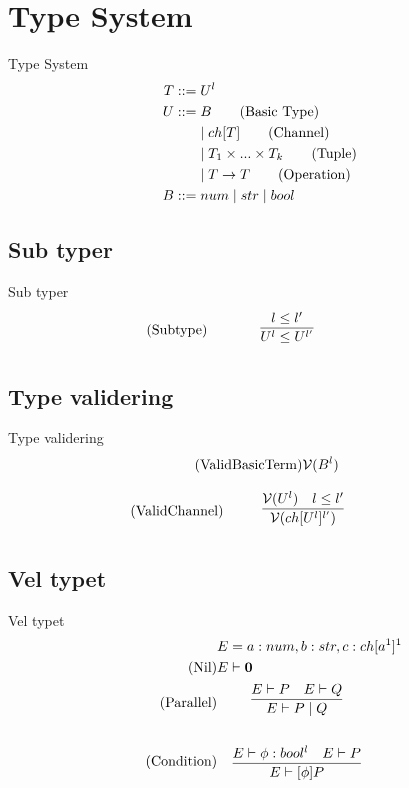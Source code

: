 \section{Type System}
\begin{frame}{Type System}
    \begin{align*}
        T::=&\;U^l\\    	
        U::=&\;B \tag{Basic Type}\\
        &\mid ch[T] \tag{Channel}\\
        &\mid T_1 \times...\times T_k \tag{Tuple}\\
        &\mid T\rightarrow T \tag{Operation}\\
        B::=&\;num 
        \mid str
        \mid bool\\
    \end{align*}
\end{frame}

\subsection{Sub typer}
\begin{frame}{Sub typer}
    \begin{align*}
       \tag{Subtype}\label{rule:Subtype} &\infrule{l\leq l'}{U^l\leq U^{l'}}
    \end{align*}
\end{frame}

\subsection{Type validering}
\begin{frame}{Type validering}
    \begin{align*}
        \tag{ValidBasicTerm}\label{rule:ValidBasicTerm} &\mathcal{V}(B^l)
    \end{align*}

    \begin{align*}
        \tag{ValidChannel}\label{rule:ValidChannel} &\infrule{\valid{U^l}\quad l\leq l'}{\valid{ch[U^l]^{l'}}}
    \end{align*}
\end{frame}

\subsection{Vel typet}
\begin{frame}{Vel typet}
    \begin{align*}
        &E=a:num, b:str, c:ch[a^1]^1\\
        \tag{Nil}\label{rule:Nil} &E \vdash \nil\\
        \tag{Parallel}\label{rule:Parallel} &\infrule{E\vdash P \quad E \vdash Q}{E \vdash P \para Q}\\
        \tag{Condition}\label{rule:Condition} &\infrule{E\vdash \phi:bool^l\quad E\vdash P}{E \vdash [\phi] P}
    \end{align*}
\end{frame}



